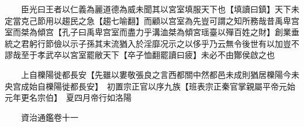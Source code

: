 　　臣光曰王者以仁義為麗道德為威未聞其以宮室填服天下也【填讀曰鎮】天下未定當克己節用以趨民之急【趨七喻翻】而顧以宫室為先豈可謂之知所務哉昔禹卑宫室而桀為傾宫【孔子曰禹卑宫室而盡力乎溝洫桀為傾宮瑶臺以殫百姓之財】創業垂統之君躬行節儉以示子孫其末流猶入於淫靡况示之以侈乎乃云無令後世有以加豈不謬哉至于孝武卒以宮室罷敝天下【卒子恤翻罷讀曰疲】未必不由酇侯啟之也

　　上自櫟陽徙都長安【先雖以婁敬張良之言西都關中然都邑未成則猶居櫟陽今未央宫成始自櫟陽徙都長安】　初置宗正官以序九族【班表宗正秦官掌親屬平帝元始元年更名宗伯】　夏四月帝行如洛陽

　　資治通鑑卷十一


    


 


 



 

 
  







 


　　
　　
　
　
　


　　

　















	
	









































 
  



















 





 












  
  
  

 





